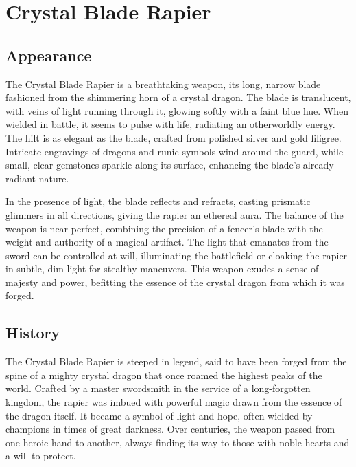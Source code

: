 
\chapter*{Crystal Blade Rapier}

\section*{Appearance}
The Crystal Blade Rapier is a breathtaking weapon, its long, narrow blade fashioned from the shimmering horn of a crystal dragon. The blade is translucent, with veins of light running through it, glowing softly with a faint blue hue. When wielded in battle, it seems to pulse with life, radiating an otherworldly energy. The hilt is as elegant as the blade, crafted from polished silver and gold filigree. Intricate engravings of dragons and runic symbols wind around the guard, while small, clear gemstones sparkle along its surface, enhancing the blade’s already radiant nature.

In the presence of light, the blade reflects and refracts, casting prismatic glimmers in all directions, giving the rapier an ethereal aura. The balance of the weapon is near perfect, combining the precision of a fencer’s blade with the weight and authority of a magical artifact. The light that emanates from the sword can be controlled at will, illuminating the battlefield or cloaking the rapier in subtle, dim light for stealthy maneuvers. This weapon exudes a sense of majesty and power, befitting the essence of the crystal dragon from which it was forged.

\vfill\eject

\section*{History}
The Crystal Blade Rapier is steeped in legend, said to have been forged from the spine of a mighty crystal dragon that once roamed the highest peaks of the world. Crafted by a master swordsmith in the service of a long-forgotten kingdom, the rapier was imbued with powerful magic drawn from the essence of the dragon itself. It became a symbol of light and hope, often wielded by champions in times of great darkness. Over centuries, the weapon passed from one heroic hand to another, always finding its way to those with noble hearts and a will to protect.


